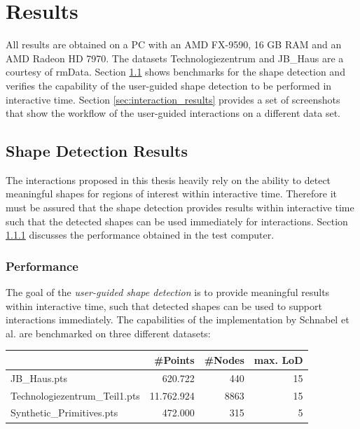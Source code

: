 \chapter{Results}
\label{chap:results}


All results are obtained on a PC with an AMD FX-9590, 16 GB RAM and an AMD Radeon HD 7970. The datasets Technologiezentrum and JB\_Haus are a courtesy of rmData\cite{rmdata}. Section \ref{sec:shape_detection_results} shows benchmarks for the shape detection and verifies the capability of the user-guided shape detection to be performed in interactive time. Section \ref{sec:interaction_results} provides a set of screenshots that show the workflow of the user-guided interactions on a different data set. 


\section{Shape Detection Results}
\label{sec:shape_detection_results}
The interactions proposed in this thesis heavily rely on the ability to detect meaningful shapes for regions of interest within interactive time. Therefore it must be assured that the shape detection provides results within interactive time such that the detected shapes can be used immediately for interactions. Section \ref{sec:shape_detection_performance} discusses the performance obtained in the test computer. 


\subsection{Performance}

\label{sec:shape_detection_performance}

The goal of the \textit{user-guided shape detection} is to provide meaningful results within interactive time, such that detected shapes can be used to support interactions immediately. The capabilities of the implementation by Schnabel et al. \cite{schnabel-2007-software} are benchmarked on three different datasets: 

\begin{center}
\begin{tabular}{ l | r | r | r }
                                                                & \textbf{\#Points}             & \textbf{\#Nodes} & \textbf{max. LoD} \\
    \hline
  JB\_Haus.pts                                    & 620.722                                 & 440             & 15 \\
  Technologiezentrum\_Teil1.pts    & 11.762.924                            & 8863             & 15 \\
  Synthetic\_Primitives.pts         & 472.000                                 & 315                 & 5 \\
    
\end{tabular}
\end{center}

